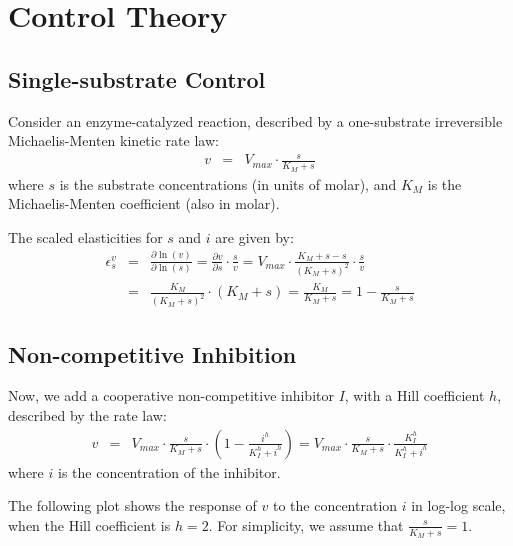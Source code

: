 \documentclass[12pt,a4paper]{article}
\begin{document}
\section{Control Theory}
\subsection{Single-substrate Control}
Consider an enzyme-catalyzed reaction, described by a one-substrate irreversible Michaelis-Menten kinetic rate law:
\begin{eqnarray}
    v &=& V_{max} \cdot \frac{s}{K_M + s}
\end{eqnarray}
where $s$ is the substrate concentrations (in units of molar), and $K_M$ is the Michaelis-Menten coefficient (also in molar).

The scaled elasticities for $s$ and $i$ are given by:
\begin{eqnarray}
    \epsilon_s^v &=& \frac{\partial \ln(v)}{\partial \ln(s)} = \frac{\partial v}{\partial s}\cdot\frac{s}{v} = V_{max} \cdot \frac{K_M + s - s}{(K_M + s)^2} \cdot \frac{s}{v} \nonumber \\
    &=& \frac{K_M}{(K_M + s)^2} \cdot (K_M + s) = \frac{K_M}{K_M + s} = 1 - \frac{s}{K_M + s}
\end{eqnarray}

\subsection{Non-competitive Inhibition}
Now, we add a cooperative non-competitive inhibitor $I$, with a Hill coefficient $h$, described by the rate law:
\begin{eqnarray}
    v &=& V_{max} \cdot \frac{s}{K_M + s} \cdot \left(1 - \frac{i^h}{K_I^h + i^h}\right) =
    V_{max} \cdot \frac{s}{K_M + s} \cdot \frac{K_I^h}{K_I^h + i^h}
\end{eqnarray}
where $i$ is the concentration of the inhibitor.

The following plot shows the response of $v$ to the concentration $i$ in log-log scale, when the Hill coefficient is $h = 2$. For simplicity, we assume that $\frac{s}{K_M + s} = 1$.

\end{document}
